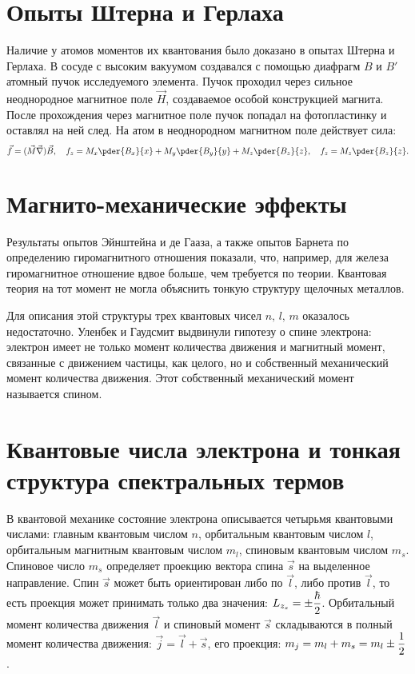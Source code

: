 \section{Опыты Штерна и Герлаха}
Наличие у атомов моментов их квантования было доказано в опытах Штерна и
Герлаха. В сосуде с высоким вакуумом создавался с помощью диафрагм \( B \) и
\( B' \) атомный пучок исследуемого элемента. Пучок проходил через сильное
неоднородное магнитное поле \( \vec{H} \), создаваемое особой конструкцией
магнита. После прохождения через магнитное поле пучок попадал на фотопластинку и
оставлял на ней след. На атом в неоднородном магнитном поле действует сила:
\[
    \vec{f} = (\vec{M}\vec{\nabla})\vec{B}, \quad f_z = M_x\pder{B_x}{x} +
    M_y\pder{B_y}{y} + M_z\pder{B_z}{z}, \quad f_z = M_z\pder{B_z}{z}.
\]

\section{Магнито-механические эффекты}
Результаты опытов Эйнштейна и де Гааза, а также опытов Барнета по определению
гиромагнитного отношения показали, что, например, для железа гиромагнитное
отношение вдвое больше, чем требуется по теории. Квантовая теория на тот момент
не могла объяснить тонкую структуру щелочных металлов.

Для описания этой структуры трех квантовых чисел \( n,\,l,\,m \) оказалось
недостаточно. Уленбек и Гаудсмит выдвинули гипотезу о спине электрона: электрон
имеет не только момент количества движения и магнитный момент, связанные с
движением частицы, как целого, но и собственный механический момент количества
движения. Этот собственный механический момент называется спином.

\section{Квантовые числа электрона и тонкая структура спектральных термов}
В квантовой механике состояние электрона описывается четырьмя квантовыми
числами: главным квантовым числом \( n \), орбитальным квантовым числом \( l \),
орбитальным магнитным квантовым числом \( m_l \), спиновым квантовым числом
\( m_s \). Спиновое число \( m_s \) определяет проекцию вектора спина
\( \vec{s} \) на выделенное направление. Спин \( \vec{s} \) может быть
ориентирован либо по \( \vec{l} \), либо против \( \vec{l} \), то есть проекция
может принимать только два значения: \( \displaystyle L_{z_s} = \pm\frac{\hbar}{2} \).
Орбитальный момент количества движения \( \vec{l} \) и спиновый момент
\( \vec{s} \) складываются в полный момент количества движения: \( \vec{j} =
\vec{l} + \vec{s} \), его проекция: \( \displaystyle m_j = m_l + m_s = m_l \pm\frac{1}{2}
\).

